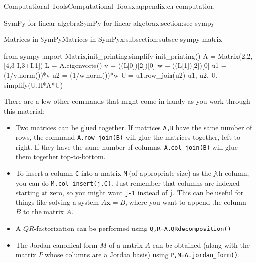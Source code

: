 \documentclass[oneside,10pt,]{book}
\newcommand{\mono}[1]{\texttt{#1}}
\numberwithin{equation}{section}
\newcommand{\xx}{\mathbf{x}}
\begin{document}
\begin{appendixptx}{Computational Tools}{}{Computational Tools}{}{}{x:appendix:ch-computation}
\begin{sectionptx}{SymPy for linear algebra}{}{SymPy for linear algebra}{}{}{x:section:sec-sympy}
\begin{subsectionptx}{Matrices in SymPy}{}{Matrices in SymPy}{}{}{x:subsection:subsec-sympy-matrix}
\begin{sageinput}
from sympy import Matrix,init_printing,simplify
init_printing()
A = Matrix(2,2,[4,3-I,3+I,1])
L = A.eigenvects()
v = ((L[0])[2])[0]
w = ((L[1])[2])[0]
u1 = (1/v.norm())*v
u2 = (1/w.norm())*w
U = u1.row_join(u2)
u1, u2, U, simplify(U.H*A*U)
\end{sageinput}
There are a few other commands that might come in handy as you work through this material:%
\begin{itemize}[label=\textbullet]
\item{}Two matrices can be glued together. If matrices \mono{A,B} have the same number of rows, the command \mono{A.row\_join(B)} will glue the matrices together, left-to-right. If they have the same number of columns, \mono{A.col\_join(B)} will glue them together top-to-bottom.%
\item{}To insert a column \mono{C} into a matrix \mono{M} (of appropriate size) as the \(j\)th column, you can do \mono{M.col\_insert(j,C)}. Just remember that columns are indexed starting at zero, so you might want \mono{j-1} instead of \mono{j}. This can be useful for things like solving a system \(A\xx=B\), where you want to append the column \(B\) to the matrix \(A\).%
\item{}A \(QR\)-factorization can be performed using \mono{Q,R=A.QRdecomposition()}%
\item{}The Jordan canonical form \(M\) of a matrix \(A\) can be obtained (along with the matrix \(P\) whose columns are a Jordan basis) using \mono{P,M=A.jordan\_form()}.%
\end{itemize}
%
\end{subsectionptx}
\end{sectionptx}
\end{appendixptx}
%
%
\typeout{************************************************}
\typeout{************************************************}
%
\end{document}
